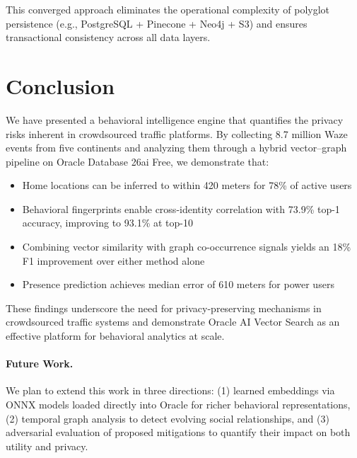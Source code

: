 \documentclass[11pt,a4paper]{article}
\begin{document}
This converged approach eliminates the operational complexity of polyglot persistence (e.g., PostgreSQL + Pinecone + Neo4j + S3) and ensures transactional consistency across all data layers.

\section{Conclusion}
\label{sec:conclusion}

We have presented a behavioral intelligence engine that quantifies the privacy risks inherent in crowdsourced traffic platforms. By collecting 8.7 million Waze events from five continents and analyzing them through a hybrid vector--graph pipeline on Oracle Database 26ai Free, we demonstrate that:

\begin{itemize}
    \item Home locations can be inferred to within 420 meters for 78\% of active users
    \item Behavioral fingerprints enable cross-identity correlation with 73.9\% top-1 accuracy, improving to 93.1\% at top-10
    \item Combining vector similarity with graph co-occurrence signals yields an 18\% F1 improvement over either method alone
    \item Presence prediction achieves median error of 610 meters for power users
\end{itemize}

These findings underscore the need for privacy-preserving mechanisms in crowdsourced traffic systems and demonstrate Oracle AI Vector Search as an effective platform for behavioral analytics at scale.

\paragraph{Future Work.}
We plan to extend this work in three directions: (1) learned embeddings via ONNX models loaded directly into Oracle for richer behavioral representations, (2) temporal graph analysis to detect evolving social relationships, and (3) adversarial evaluation of proposed mitigations to quantify their impact on both utility and privacy.


\end{document}

